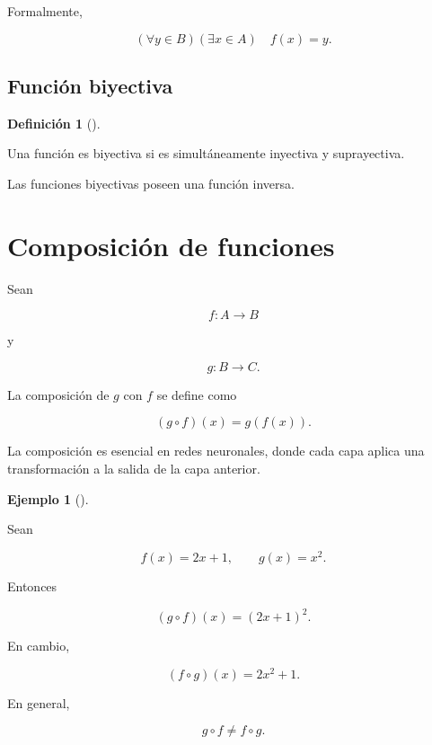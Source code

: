 \documentclass[
  spanish,
  10.5pt,
  letterpaper,
  DIV=11,
  numbers=noendperiod,
  oneside,
  open=any]{scrreprt}
\theoremstyle{definition}
\newtheorem{definition}{Definición}[chapter]
\theoremstyle{definition}
\newtheorem{example}{Ejemplo}[chapter]
\theoremstyle{plain}
\theoremstyle{remark}
\begin{document}
Formalmente,

\[
(\forall y\in B)(\exists x\in A)
\quad
f(x)=y.
\]

\subsection*{Función biyectiva}\label{funciuxf3n-biyectiva}

\begin{definition}[]\protect\hypertarget{def-biyectiva}{}\label{def-biyectiva}

Una función es biyectiva si es simultáneamente inyectiva y suprayectiva.

\end{definition}

Las funciones biyectivas poseen una función inversa.

\section*{Composición de funciones}\label{composiciuxf3n-de-funciones}


Sean

\[
f:A\to B
\]

y

\[
g:B\to C.
\]

La composición de \(g\) con \(f\) se define como

\[
(g\circ f)(x)=g(f(x)).
\]

La composición es esencial en redes neuronales, donde cada capa aplica
una transformación a la salida de la capa anterior.

\begin{example}[]\protect\hypertarget{exm-composicion}{}\label{exm-composicion}

Sean

\[
f(x)=2x+1,
\qquad
g(x)=x^2.
\]

Entonces

\[
(g\circ f)(x)
=
(2x+1)^2.
\]

En cambio,

\[
(f\circ g)(x)
=
2x^2+1.
\]

En general,

\[
g\circ f\neq f\circ g.
\]

\end{example}
\end{document}
